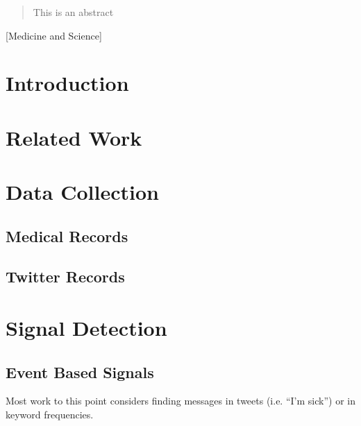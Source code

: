 \documentclass{acm_proc_article-sp}
\begin{document}
\maketitle
\begin{abstract}
This is an abstract
\end{abstract}

[Medicine and Science]



\section{Introduction}

\section{Related Work}

\section{Data Collection}
\subsection{Medical Records}
\subsection{Twitter Records}

\section{Signal Detection}
\subsection{Event Based Signals}

Most work to this point considers finding messages in tweets (i.e. ``I'm sick'') or in keyword frequencies. 
\end{document}
